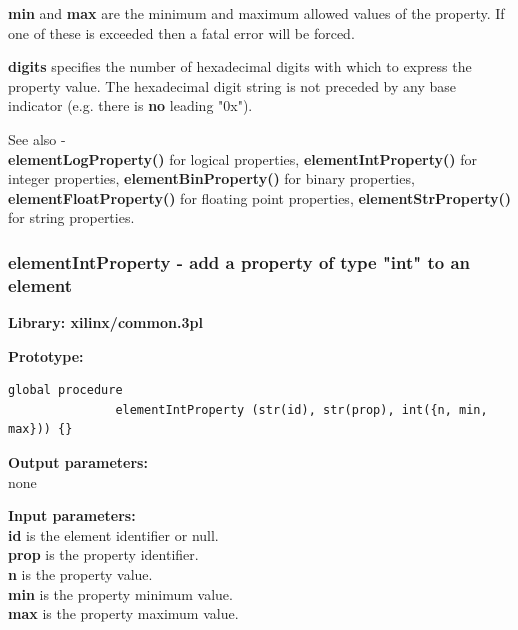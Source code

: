             {\bf min} and {\bf max} are the minimum and maximum allowed values
            of the property. If one of these is exceeded then a fatal error
            will be forced.
            
            {\bf digits} specifies the number of hexadecimal digits with which to
            express the property value. The hexadecimal digit string is not
            preceded by any base indicator (e.g. there is {\bf no} leading "0x").
            
            See also - \\
            {\bf elementLogProperty()}  for logical properties,
            {\bf elementIntProperty()}  for integer properties,
            {\bf elementBinProperty()}  for binary properties,
            {\bf elementFloatProperty()}  for floating point properties,
            {\bf elementStrProperty()}  for string properties.








        \subsubsection{elementIntProperty - add a property of type "int" to an element}\label{sec:lpelementIntProperty}
            
            {\bf Library: xilinx/common.3pl}

            {\bf Prototype:} \\
            \vsp
            \begin{lstlisting}[gobble=12, language=threepl]
               global procedure
               elementIntProperty (str(id), str(prop), int({n, min, max})) {}
            \end{lstlisting}

            {\bf Output parameters:} \\
            none

            {\bf Input parameters:} \\            
            {\bf id} is the element identifier or null.\\
            {\bf prop} is the property identifier.\\
            {\bf n} is the property value.\\
            {\bf min} is the property minimum value.\\
            {\bf max} is the property maximum value.\\
        
